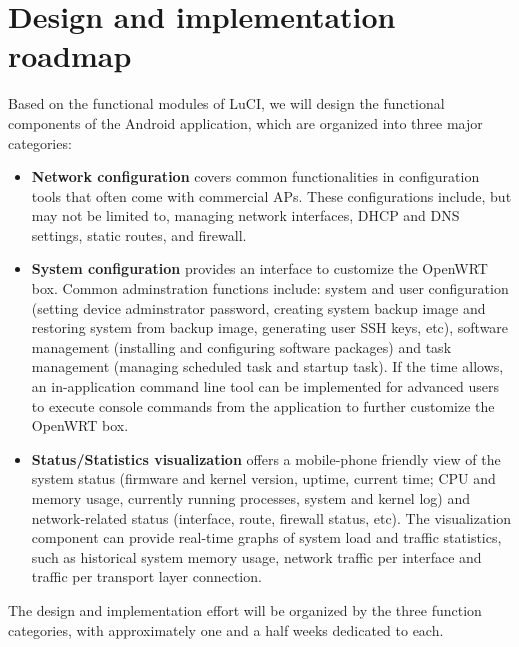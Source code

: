 \section{Design and implementation \\ roadmap}
	
Based on the functional modules of LuCI, we will design the functional components of the Android application, which are organized into three major categories:
	
\begin{itemize}
		
		\item
		\textbf{Network configuration} covers common functionalities in configuration tools that often come with commercial APs. These configurations include, but may not be limited to, managing network interfaces, DHCP and DNS settings, static routes, and firewall.
		
		\item
		\textbf{System configuration} provides an interface to customize the OpenWRT box. Common adminstration functions include: system and user configuration (setting device adminstrator password, creating system backup image and restoring system from backup image, generating user SSH keys, etc), software management (installing and configuring software packages) and task management (managing scheduled task and startup task). If the time allows, an in-application command line tool can be implemented for advanced users to execute console commands from the application to further customize the OpenWRT box.
		
		\item
		\textbf{Status/Statistics visualization} offers a mobile-phone friendly view of the system status (firmware and kernel version, uptime, current time; CPU and memory usage, currently running processes, system and kernel log) and network-related status (interface, route, firewall status, etc). The visualization component can provide real-time graphs of system load and traffic statistics, such as historical system memory usage, network traffic per interface and traffic per transport layer connection.
		
\end{itemize}
	
	The design and implementation effort will be organized by the three function categories, with approximately one and a half weeks dedicated to each.
	
